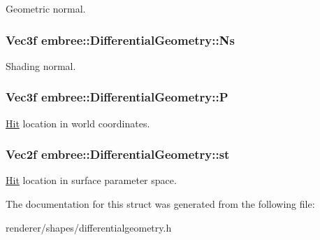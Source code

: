 Geometric normal. 

\hypertarget{structembree_1_1_differential_geometry_a7c1fe2671801ed94e10d67b340bfd40c}{
\subsubsection[{Ns}]{\setlength{\rightskip}{0pt plus 5cm}Vec3f {\bf embree::DifferentialGeometry::Ns}}}
\label{structembree_1_1_differential_geometry_a7c1fe2671801ed94e10d67b340bfd40c}


Shading normal. 

\hypertarget{structembree_1_1_differential_geometry_accb803ee82e59dce5a4aeb5e336101dc}{
\subsubsection[{P}]{\setlength{\rightskip}{0pt plus 5cm}Vec3f {\bf embree::DifferentialGeometry::P}}}
\label{structembree_1_1_differential_geometry_accb803ee82e59dce5a4aeb5e336101dc}


\hyperlink{structembree_1_1_hit}{Hit} location in world coordinates. 

\hypertarget{structembree_1_1_differential_geometry_ae1663be15511c0bb07a8558ba9b169ed}{
\subsubsection[{st}]{\setlength{\rightskip}{0pt plus 5cm}Vec2f {\bf embree::DifferentialGeometry::st}}}
\label{structembree_1_1_differential_geometry_ae1663be15511c0bb07a8558ba9b169ed}


\hyperlink{structembree_1_1_hit}{Hit} location in surface parameter space. 



The documentation for this struct was generated from the following file:\begin{DoxyCompactItemize}
\item 
renderer/shapes/differentialgeometry.h\end{DoxyCompactItemize}
